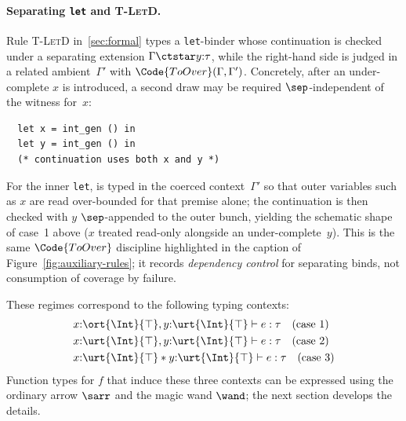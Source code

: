 \paragraph{Separating \texttt{let} and \textsc{T-LetD}.}
Rule \textsc{T-LetD} in~\autoref{sec:formal} types a \texttt{let}-binder whose continuation is checked under a separating extension $\Gamma \ctstar y{:}\tau$, while the right-hand side is judged in a related ambient~$\Gamma'$ with $\Code{ToOver}(\Gamma,\Gamma')$.
Concretely, after an under-complete $x$ is introduced, a second draw may be required $\sep$-independent of the witness for~$x$:
\begin{verbatim}
  let x = int_gen () in
  let y = int_gen () in
  (* continuation uses both x and y *)
\end{verbatim}
\noindent
For the inner \texttt{let},  is typed in the coerced context~$\Gamma'$ so that outer variables such as $x$ are read over-bounded for that premise alone; the continuation is then checked with $y$ $\sep$-appended to the outer bunch, yielding the schematic shape of case~1 above ($x$ treated read-only alongside an under-complete~$y$).
This is the same $\Code{ToOver}$ discipline highlighted in the caption of Figure~\ref{fig:auxiliary-rules}; it records \emph{dependency control} for separating binds, not consumption of coverage by failure.

These regimes correspond to the following typing contexts:
\begin{align*}
  &x{:}\ort{\Int}{\top}, y{:}\urt{\Int}{\top} \vdash e : \tau \quad \text{(case 1)}
  \\&x{:}\urt{\Int}{\top}, y{:}\urt{\Int}{\top} \vdash e : \tau \quad \text{(case 2)}
  \\&x{:}\urt{\Int}{\top} * y{:}\urt{\Int}{\top} \vdash e : \tau \quad \text{(case 3)}
\end{align*}
Function types for $f$ that induce these three contexts can be expressed using the ordinary arrow $\sarr$ and the magic wand $\wand$; the next section develops the details.

